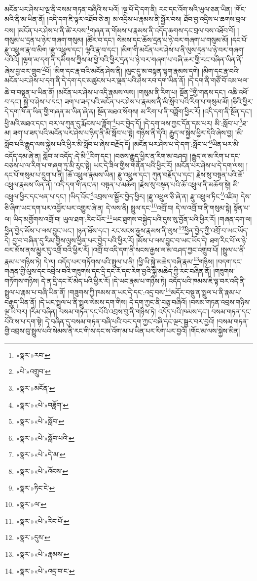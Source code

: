 མངོན་པར་ཤེས་པ་ལྔ་ནི་བསམ་གཏན་བཞིའི་ས་པའོ། །ལྔ་པོ་དེ་དག་ནི། རང་དང་འོག་སའི་ཡུལ་ཅན་ཡིན། །གོང་མའི་ནི་མ་ཡིན་ནོ། །འདི་དག་ཇི་ལྟར་འཐོབ་ཅེ་ན། མ་འདྲིས་པ་རྣམས་ནི་སྦྱོར་བས། ཐོབ་བྱ་འདྲིས་པ་ཆགས་བྲལ་བས། །མངོན་པར་ཤེས་པ་ནི་ཚེ་རབས་\footnote{«སྣར་»རབ་}གཞན་ན་གོམས་པ་རྣམས་ནི་འདོད་ཆགས་དང་བྲལ་བས་འཐོབ་བོ། །གསུམ་པ་དྲན་པ་ཉེར་གཞག་གསུམ། །ཚོར་བ་དང་། སེམས་དང་ཆོས་དྲན་པ་ཉེ་བར་གཞག་པ་གསུམ་མོ། །དང་པོ་རྫུ་འཕྲུལ་རྣ་བ་མིག །རྫུ་འཕྲུལ་དང་། ལྷའི་རྣ་བ་དང་། །མིག་གི་མངོན་པར་ཤེས་པ་ནི་ལུས་དྲན་པ་ཉེ་བར་གཞག་པའིའོ། །ལྷག་མ་དག་ནི་དམིགས་ཀྱིས་མ་ཕྱེ་བའི་ཕྱིར་དྲན་པ་ཉེ་བར་གཞག་པ་བཞི་ཆར་གྱི་རང་བཞིན་ཡིན་ནོ་ཞེས་བྱ་བར་གྲུབ་\footnote{«པེ་»འགྲུབ་}པོ། །མིག་དང་རྣ་བའི་མངོན་ཤེས་ནི། །ལུང་དུ་མ་བསྟན་ལྷག་རྣམས་དགེ། །མིག་དང་རྣ་བའི་མངོན་པར་ཤེས་པ་དག་ནི་དེ་དག་དང་མཚུངས་པར་ལྡན་པའི་ཤེས་རབ་དག་ཡིན་ནོ། །དེ་དག་ནི་གཙོ་བོ་འམ་ཕལ་ཆེ་བ་བསྟན་པ་ཡིན་ནོ། །མངོན་པར་ཤེས་པ་འདི་རྣམས་ལས། །གསུམ་ནི་རིག་པ། སྔོན་\footnote{«སྣར་»མངོན་}གྱི་གནས་དང་། འཆི་འཕོ་བ་དང་། སྐྱེ་བ་ཤེས་པ་དང་། ཟག་པ་ཟད་པའི་མངོན་པར་ཤེས་པ་རྣམས་ནི་མི་སློབ་པའི་རིག་པ་གསུམ་མོ། །ཅིའི་ཕྱིར་དེ་དག་ཁོ་ན་ཡིན་གྱི་གཞན་མ་ཡིན་ཞེ་ན། སྔོན་མཐའ་སོགས། མ་རིག་པ་ནི་བཟློག་ཕྱིར་རོ། །འདི་དག་ནི་སྔོན་དང་། ཕྱི་མའི་མཐའ་དང་། བར་ལ་ཀུན་དུ་རྨོངས་པ་ཟློག་\footnote{«སྣར་»«པེ་»བཟློག་}པར་བྱེད་དོ། །དེ་དག་ལས་ཀྱང་དོན་དམ་པར། མི་:སློབ་པ་\footnote{«སྣར་»«པེ་»སློབ་}ཐ་མ། ཟག་པ་ཟད་པའི་མངོན་པར་ཤེས་པ་ཉིད་ནི་མི་སློབ་པ་སྟེ། གཉིས་ནི་དེའི། རྒྱུད་ལ་སྐྱེས་ཕྱིར་དེའི་ཞེས་བྱ། །མི་སློབ་པའི་རྒྱུད་ལས་སྐྱེས་པའི་ཕྱིར་མི་སློབ་པ་ཞེས་བརྗོད་དོ། །མངོན་པར་ཤེས་པ་དེ་དག་:སློབ་པ་\footnote{«སྣར་»«པེ་»སློབ་པའི་}ཡིན་པར་མི་འདོད་དམ་ཞེ་ན། སློབ་ལ་འདོད་:དེ་མི་\footnote{«སྣར་»«པེ་»དེ་མ་}རིག་དང་། །བཅས་རྒྱུད་ཕྱིར་ན་རིག་མ་བཤད། །རྒྱུད་ལ་མ་རིག་པ་དང་བཅས་པ་ལ་རིག་པ་གཞག་ཏུ་མི་རུང་སྟེ། ཡང་དེ་ཟིལ་གྱིས་གནོན་པའི་ཕྱིར་རོ། །མངོན་པར་ཤེས་པ་དེ་དག་ལས། །དང་པོ་གསུམ་པ་དྲུག་པ་ནི། །ཆོ་འཕྲུལ་རྣམས་ཡིན། རྫུ་འཕྲུལ་དང་། ཀུན་བརྗོད་པ་དང་། རྗེས་སུ་བསྟན་པའི་ཆོ་འཕྲུལ་རྣམས་ཡིན་ནོ། །འདི་དག་གི་ནང་ན། བསྟན་པ་མཆོག །རྗེས་སུ་བསྟན་པའི་ཆོ་འཕྲུལ་ནི་མཆོག་སྟེ། མི་འཕྲུལ་ཕྱིར་དང་ཕན་པ་དང་། །ཡིད་འོང་\footnote{«སྣར་»«པེ་»འོངས་}འབྲས་ལ་སྦྱོར་བྱེད་ཕྱིར། །རྫུ་འཕྲུལ་ཅི་ཞེ་ན། རྫུ་འཕྲུལ་ཏིང་\footnote{«སྣར་»ཏིང་ངེ་}འཛིན། དེས་ཅི་ཞིག་ཡང་དག་པར་འབྱོར་པར་འགྱུར་ཞེ་ན། དེ་ལས་ནི། སྤྲུལ་དང་\footnote{«སྣར་»ལ་}འགྲོ་བ། དེ་ལ་འགྲོ་བ་ནི་གསུམ་སྟེ། སྟོན་པ་ལ། ཡིད་མགྱོགས་འགྲོ་བ། ཡུལ་ཐག་:རིང་པོར་\footnote{«སྣར་»«པེ་»རིང་པོ་}ཡང་ཐུགས་བསྐྱེད་པའི་དུས་སུ་བྱོན་པའི་ཕྱིར་རོ། །གཞན་དག་ལ། ཕྱིན་བྱེད་མོས་པ་ལས་བྱུང་ཡང་། །ཉན་ཐོས་དང་། རང་སངས་རྒྱས་རྣམས་ནི་ལུས་\footnote{«སྣར་»དུས་}ཕྱིན་བྱེད་ཀྱི་འགྲོ་བ་ཡང་ཡོད་དེ། བྱ་བ་བཞིན་དུ་རིམ་གྱིས་ལུས་ཕྱིན་པར་བྱེད་པའི་ཕྱིར་རོ། །མོས་པ་ལས་བྱུང་བ་ཡང་ཡོད་དེ། ཐག་རིང་པོ་ལ་ཉེ་བར་མོས་ནས་མྱུར་དུ་འགྲོ་བའི་ཕྱིར་རོ། །འགྲོ་བ་འདི་དག་ནི་སངས་རྒྱས་ལ་མ་བཤད་ཀྱང་འགྲུབ་པོ། །སྤྲུལ་པ་ནི་རྣམ་པ་གཉིས་ཏེ། དེ་ལ། འདོད་པར་གཏོགས་པའི་སྤྲུལ་པ་ནི། །ཕྱི་ཡི་སྐྱེ་མཆེད་བཞི་རྣམ་\footnote{«སྣར་»«པེ་»རྣམས་}གཉིས། །བདག་དང་གཞན་གྱི་ལུས་དང་འབྲེལ་བའི་གཟུགས་དང་དྲི་དང་རོ་དང་རེག་བྱའི་སྐྱེ་མཆེད་ཀྱི་རང་བཞིན་ནོ། །གཟུགས་གཏོགས་གཉིས། དེ་ན་དྲི་དང་རོ་མེད་པའི་ཕྱིར་རོ། །དེ་ཡང་རྣམ་པ་གཉིས་ཏེ། འདོད་པའི་ཁམས་ཇི་ལྟ་བར་འདི་ནི་སྤྲུལ་པ་རྣམ་པ་བཞི་ཡིན་ནོ། །གཟུགས་ཀྱི་ཁམས་ན་ཡང་དེ་དང་:འདྲ་བས་\footnote{«སྣར་»«པེ་»འདྲ་བ་ང་}མདོར་བསྡུ་ན་སྤྲུལ་པ་ནི་རྣམ་པ་བརྒྱད་ཡིན་ནོ། །དེ་ཡང་སྤྲུལ་པ་ནི་སྤྲུལ་སེམས་དག་གིས། དེ་དག་ཀྱང་ནི་བཅུ་བཞིའོ། །བསམ་གཏན་འབྲས་གཉིས་ལྔ་ཡི་བར། །རིམ་བཞིན། བསམ་གཏན་དང་པོའི་འབྲས་བུ་ནི་གཉིས་ཏེ། འདོད་པའི་ཁམས་དང་། བསམ་གཏན་དང་པོའི་ས་པ་དག་སྟེ། དེ་བཞིན་དུ་བསམ་གཏན་བཞི་པའི་བར་དག་ཀྱང་བཞི་དང་ལྔར་སྦྱར་བར་བྱའོ། །བསམ་གཏན་གྱི་འབྲས་བུ་སྤྲུལ་པའི་སེམས་ནི་རང་གི་ས་དང་ས་འོག་མ་པ་ཡིན་པར་རིག་པར་བྱའོ། །གོང་མ་ལས་སྐྱེས་མིན། 
